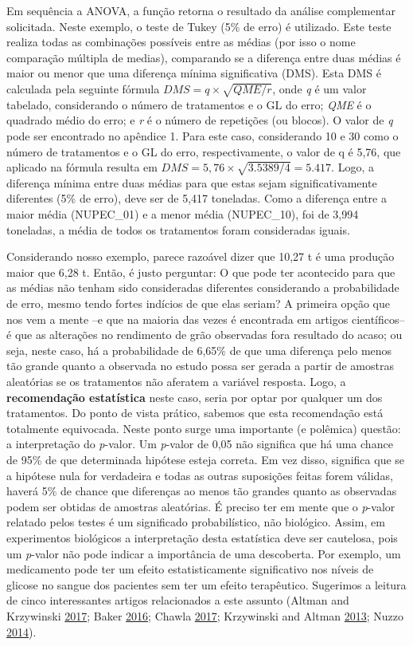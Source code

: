 \documentclass[
]{book}
\numberwithin{equation}{section}
\begin{document}
Em sequência a ANOVA, a função retorna o resultado da análise complementar solicitada. Neste exemplo, o teste de Tukey (5\% de erro) é utilizado. Este teste realiza todas as combinações possíveis entre as médias (por isso o nome comparação múltipla de medias), comparando se a diferença entre duas médias é maior ou menor que uma diferença mínima significativa (DMS). Esta DMS é calculada pela seguinte fórmula \(DMS = q \times \sqrt{QME/r}\), onde \emph{q} é um valor tabelado, considerando o número de tratamentos e o GL do erro; \emph{QME} é o quadrado médio do erro; e \emph{r} é o número de repetições (ou blocos). O valor de \emph{q} pode ser encontrado no apêndice 1. Para este caso, considerando 10 e 30 como o número de tratamentos e o GL do erro, respectivamente, o valor de q é 5,76, que aplicado na fórmula resulta em \(DMS = 5,76 \times \sqrt{3.5389/4}=5.417\). Logo, a diferença mínima entre duas médias para que estas sejam significativamente diferentes (5\% de erro), deve ser de 5,417 toneladas. Como a diferença entre a maior média (NUPEC\_01) e a menor média (NUPEC\_10), foi de 3,994 toneladas, a média de todos os tratamentos foram consideradas iguais.

Considerando nosso exemplo, parece razoável dizer que 10,27 t é uma produção maior que 6,28 t. Então, é justo perguntar: O que pode ter acontecido para que as médias não tenham sido consideradas diferentes considerando a probabilidade de erro, mesmo tendo fortes indícios de que elas seriam? A primeira opção que nos vem a mente --e que na maioria das vezes é encontrada em artigos científicos-- é que as alterações no rendimento de grão observadas fora resultado do acaso; ou seja, neste caso, há a probabilidade de 6,65\% de que uma diferença pelo menos tão grande quanto a observada no estudo possa ser gerada a partir de amostras aleatórias se os tratamentos não aferatem a variável resposta. Logo, a \textbf{recomendação estatística} neste caso, seria por optar por qualquer um dos tratamentos. Do ponto de vista prático, sabemos que esta recomendação está totalmente equivocada. Neste ponto surge uma importante (e polêmica) questão: a interpretação do \emph{p}-valor. Um \emph{p}-valor de 0,05 não significa que há uma chance de 95\% de que determinada hipótese esteja correta. Em vez disso, significa que se a hipótese nula for verdadeira e todas as outras suposições feitas forem válidas, haverá 5\% de chance que diferenças ao menos tão grandes quanto as observadas podem ser obtidas de amostras aleatórias. É preciso ter em mente que o \emph{p}-valor relatado pelos testes é um significado probabilístico, não biológico. Assim, em experimentos biológicos a interpretação desta estatística deve ser cautelosa, pois um \emph{p}-valor não pode indicar a importância de uma descoberta. Por exemplo, um medicamento pode ter um efeito estatisticamente significativo nos níveis de glicose no sangue dos pacientes sem ter um efeito terapêutico. Sugerimos a leitura de cinco interessantes artigos relacionados a este assunto (Altman and Krzywinski \protect\hyperlink{ref-Altman2017}{2017}; Baker \protect\hyperlink{ref-Baker2016}{2016}; Chawla \protect\hyperlink{ref-Chawla2017}{2017}; Krzywinski and Altman \protect\hyperlink{ref-Krzywinski2013}{2013}; Nuzzo \protect\hyperlink{ref-Nuzzo2014}{2014}).
\end{document}
